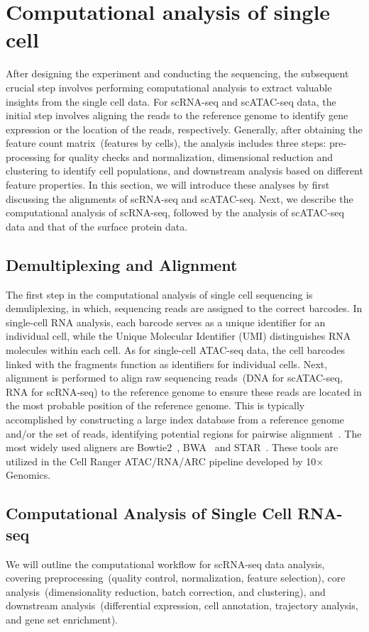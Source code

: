 \section{Computational analysis of single cell}
\label{background:computational_singlecell}
After designing the experiment and conducting the sequencing, the subsequent crucial step involves performing computational analysis to extract valuable insights from the single cell data. For scRNA-seq and scATAC-seq data, the initial step involves aligning the reads to the reference genome to identify gene expression or the location of the reads, respectively. Generally, after obtaining the feature count matrix~(features by cells), the analysis includes three steps: pre-processing for quality checks and normalization, dimensional reduction and clustering to identify cell populations, and downstream analysis based on different feature properties. In this section, we will introduce these analyses by first discussing the alignments of scRNA-seq and scATAC-seq. Next, we describe the computational analysis of scRNA-seq, followed by the analysis of scATAC-seq data and that of the surface protein data.

\subsection{Demultiplexing and Alignment}
\label{background:sec2:alignment}
The first step in the computational analysis of single cell sequencing is demuliplexing, in which, sequencing reads are assigned to the correct barcodes. In single-cell RNA analysis, each barcode serves as a unique identifier for an individual cell, while the Unique Molecular Identifier (UMI) distinguishes RNA molecules within each cell. As for single-cell ATAC-seq data, the cell barcodes linked with the fragments function as identifiers for individual cells. Next, alignment is performed to align raw sequencing reads~(DNA for scATAC-seq, RNA for scRNA-seq) to the reference genome to ensure these reads are located in the most probable position of the reference genome. This is typically accomplished by constructing a large index database from a reference genome and/or the set of reads, identifying potential regions for pairwise alignment~\citep{alser2021alignment}. The most widely used aligners are Bowtie2~\citep{langmead2012bowtie2}, BWA~\citep{li2009BWA} and STAR~\citep{dobin2013star}. These tools are utilized in the Cell Ranger ATAC/RNA/ARC pipeline developed by 10$\times$ Genomics.


\subsection{Computational Analysis of Single Cell RNA-seq}
\label{background:sec2:scRNA}
We will outline the computational workflow for scRNA-seq data analysis, covering preprocessing~(quality control, normalization, feature selection), core analysis~(dimensionality reduction, batch correction, and clustering), and downstream analysis~(differential expression, cell annotation, trajectory analysis, and gene set enrichment).

